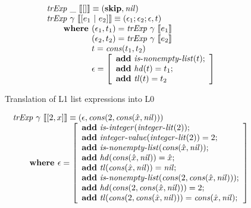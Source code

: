 \begin{figure}
\[
\begin{array}{l}
\trExp{\_}{[]} \equiv (
  \skipE, \mathit{nil}
)\\
\trExp{\gamma}{[e_1~|~e_2]} \equiv (\epsilon_1;\epsilon_2;\epsilon, t)\\
  \qquad \textbf{where } (\epsilon_1, t_1) = \trExp{\gamma}{e_1}\\ 
  \qquad \phantom{\textbf{where }} (\epsilon_2, t_2) = \trExp{\gamma}{e_2}\\ 
  \qquad \phantom{\textbf{where }} t = \mathit{cons}(t_1, t_2)\\ 
  \qquad \phantom{\textbf{where }} \epsilon = \left[
    \begin{array}{l}
      \addE~\isnelist{t};\\
      \addE~\mathit{hd}(t) = t_1;\\
      \addE~\mathit{tl}(t) = t_2\\
    \end{array}
  \right]
\end{array}
\]
\caption{Translation of L1 list expressions into L0}
\label{fig:listtr}
\end{figure}

\[
\begin{array}{l}
\mathit{trExp}~\gamma~\llbracket[2, x]\rrbracket \equiv (\epsilon, \mathit{cons}(2, \mathit{cons}(\hat{x}, \mathit{nil})))\\
\qquad \textbf{where } \epsilon = \left[ 
\begin{array}{l}
\textbf{add}~\mathit{is\mbox{-}integer}(\mathit{integer\mbox{-}lit}(2));\\
\textbf{add}~\mathit{integer\mbox{-}value}(\mathit{integer\mbox{-}lit}(2)) = 2;\\
\textbf{add}~\mathit{is\mbox{-}nonempty\mbox{-}list}(\mathit{cons}(\hat{x}, \mathit{nil}));\\
\textbf{add}~\mathit{hd}(\mathit{cons}(\hat{x}, \mathit{nil})) = \hat{x};\\
\textbf{add}~\mathit{tl}(\mathit{cons}(\hat{x}, \mathit{nil})) = \mathit{nil};\\
\textbf{add}~\mathit{is\mbox{-}nonempty\mbox{-}list}(\mathit{cons}(2, \mathit{cons}(\hat{x}, \mathit{nil})));\\
\textbf{add}~\mathit{hd}(\mathit{cons}(2, \mathit{cons}(\hat{x}, \mathit{nil}))) = 2;\\
\textbf{add}~\mathit{tl}(\mathit{cons}(2, \mathit{cons}(\hat{x}, \mathit{nil}))) = \mathit{cons}(\hat{x}, \mathit{nil});\\
\end{array}
\right]
\end{array}
\]

